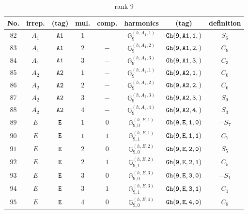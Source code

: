 \documentclass[fleqn,8pt]{jsarticle}
\begin{document}
\begin{table}[ht!]
\begin{center}
\caption{rank 9}
\renewcommand{\arraystretch}{1.3}
\begin{tabular}{cccccccc} \hline \hline
No. & irrep. & (tag) & mul. & comp. & harmonics & (tag) & definition \\ \hline
$ 82 $ & $ A_{1} $ & $ {\tt A1} $ & $ 1 $ & $ - $ & $ \mathbb{G}_{9}^{(h,A_{1},1)} $ & $ {\tt Gh(9,A1,1,)} $ & $ S_{6} $ \\
$ 83 $ & $ A_{1} $ & $ {\tt A1} $ & $ 2 $ & $ - $ & $ \mathbb{G}_{9}^{(h,A_{1},2)} $ & $ {\tt Gh(9,A1,2,)} $ & $ C_{9} $ \\
$ 84 $ & $ A_{1} $ & $ {\tt A1} $ & $ 3 $ & $ - $ & $ \mathbb{G}_{9}^{(h,A_{1},3)} $ & $ {\tt Gh(9,A1,3,)} $ & $ C_{3} $ \\
$ 85 $ & $ A_{2} $ & $ {\tt A2} $ & $ 1 $ & $ - $ & $ \mathbb{G}_{9}^{(h,A_{2},1)} $ & $ {\tt Gh(9,A2,1,)} $ & $ C_{0} $ \\
$ 86 $ & $ A_{2} $ & $ {\tt A2} $ & $ 2 $ & $ - $ & $ \mathbb{G}_{9}^{(h,A_{2},2)} $ & $ {\tt Gh(9,A2,2,)} $ & $ C_{6} $ \\
$ 87 $ & $ A_{2} $ & $ {\tt A2} $ & $ 3 $ & $ - $ & $ \mathbb{G}_{9}^{(h,A_{2},3)} $ & $ {\tt Gh(9,A2,3,)} $ & $ S_{9} $ \\
$ 88 $ & $ A_{2} $ & $ {\tt A2} $ & $ 4 $ & $ - $ & $ \mathbb{G}_{9}^{(h,A_{2},4)} $ & $ {\tt Gh(9,A2,4,)} $ & $ S_{3} $ \\
$ 89 $ & $ E $ & $ {\tt E} $ & $ 1 $ & $ 0 $ & $ \mathbb{G}_{9,0}^{(h,E,1)} $ & $ {\tt Gh(9,E,1,0)} $ & $ - S_{7} $ \\
$ 90 $ & $ E $ & $ {\tt E} $ & $ 1 $ & $ 1 $ & $ \mathbb{G}_{9,1}^{(h,E,1)} $ & $ {\tt Gh(9,E,1,1)} $ & $ C_{7} $ \\
$ 91 $ & $ E $ & $ {\tt E} $ & $ 2 $ & $ 0 $ & $ \mathbb{G}_{9,0}^{(h,E,2)} $ & $ {\tt Gh(9,E,2,0)} $ & $ S_{5} $ \\
$ 92 $ & $ E $ & $ {\tt E} $ & $ 2 $ & $ 1 $ & $ \mathbb{G}_{9,1}^{(h,E,2)} $ & $ {\tt Gh(9,E,2,1)} $ & $ C_{5} $ \\
$ 93 $ & $ E $ & $ {\tt E} $ & $ 3 $ & $ 0 $ & $ \mathbb{G}_{9,0}^{(h,E,3)} $ & $ {\tt Gh(9,E,3,0)} $ & $ - S_{1} $ \\
$ 94 $ & $ E $ & $ {\tt E} $ & $ 3 $ & $ 1 $ & $ \mathbb{G}_{9,1}^{(h,E,3)} $ & $ {\tt Gh(9,E,3,1)} $ & $ C_{1} $ \\
$ 95 $ & $ E $ & $ {\tt E} $ & $ 4 $ & $ 0 $ & $ \mathbb{G}_{9,0}^{(h,E,4)} $ & $ {\tt Gh(9,E,4,0)} $ & $ C_{8} $ \\

\end{tabular}
\end{center}
\end{table}
\end{document}
